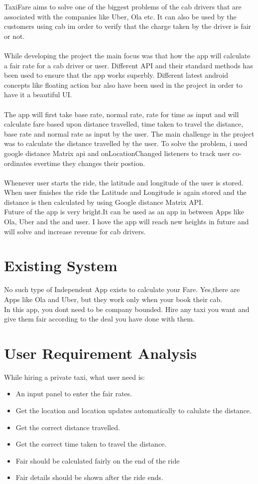 TaxiFare aims to solve one of the biggest problems of the cab drivers that are associated with the companies like Uber, Ola etc. It can also be used by the customers using cab im order to verify that the charge taken by the driver is fair or not.\\
\\
While developing the project the main focus was that how the app will calculate a fair rate for a cab driver or user. Different API and their standard methods has been used to ensure that the app works superbly. Different latest android concepts like floating action bar also have been used in the project in order to have it a beautiful UI.\\
\\
The app will first take base rate, normal rate, rate for time as input and will calculate fare based upon distance travelled, time taken to travel the distance, base rate and normal rate as input by the user. The main challenge in the project was to calculate the distance travelled by the user. To solve the problem, i used google distance Matrix api and onLocationChanged listeners to track user co-ordinates evertime they changes their postion.\\
\\
Whenever user starts the ride, the latitude and longitude of the user is stored. When user finishes the ride the Latitude and Longitude is again stored and the distance is then calculated by using Google distance Matrix API.\\
Future of the app is very bright.It can be used as an app in between Apps like Ola, Uber and the and user. I hove the app will reach new heights in future and will solve and increase revenue for cab drivers.
\section{Existing System}

No such type of Independent App exists to calculate your Fare. Yes,there are Apps like Ola and Uber, but they work only when your book their cab.\\
In this app, you dont need to be company bounded. Hire any taxi you want and give them fair according to the deal you have done with them.
\section{User Requirement Analysis}
While hiring a private taxi, what user need is:
\begin{itemize}
	\item An input panel to enter the fair rates.
	\item Get the location and location updates automatically to calulate the distance.
	\item Get the correct distance travelled.
	\item Get the correct time taken to travel the distance.
	\item Fair should be calculated fairly on the end of the ride
	\item Fair details should be shown after the ride ends.
\end{itemize}

